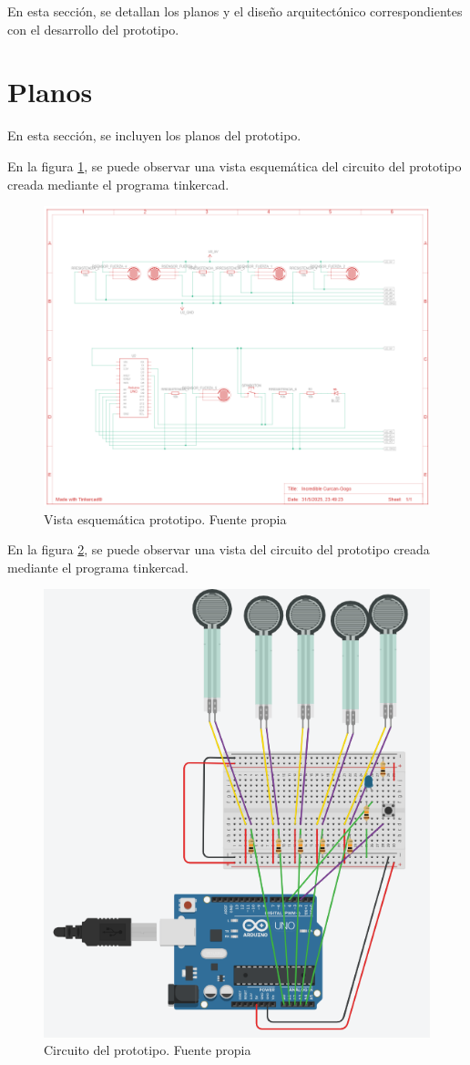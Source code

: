 En esta sección, se detallan los planos y el diseño arquitectónico correspondientes con el desarrollo del prototipo.
\section{Planos}
En esta sección, se incluyen los planos del prototipo. 

En la figura \ref{fig:Vista esquemática prototipo.}, se puede observar una vista esquemática del circuito del prototipo creada mediante el programa tinkercad. 
\begin{figure}
    \centering
    \includegraphics[width=0.8\linewidth]{img/Vista esquematica prototipo.png}
    \caption{Vista esquemática prototipo. Fuente propia}
    \label{fig:Vista esquemática prototipo.}
\end{figure}

En la figura \ref{fig:Circuito del prototipo}, se puede observar una vista del circuito del prototipo creada mediante el programa tinkercad. 
\begin{figure}
    \centering
    \includegraphics[width=0.5\linewidth]{img/Circuito.png}
    \caption{Circuito del prototipo. Fuente propia}
    \label{fig:Circuito del prototipo}
\end{figure}

